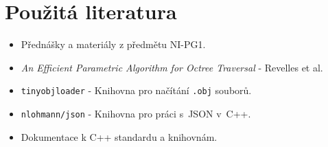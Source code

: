 \documentclass[10pt,a4paper,twocolumn]{article}
\begin{document}
\section{Použitá literatura}
\begin{itemize}
    \item Přednášky a materiály z předmětu NI-PG1.
    \item \textit{An Efficient Parametric Algorithm for Octree Traversal} - Revelles et al.
    \item \texttt{tinyobjloader} - Knihovna pro načítání \texttt{.obj} souborů.
    \item \texttt{nlohmann/json} - Knihovna pro práci s~JSON v~C++.
    \item Dokumentace k C++ standardu a knihovnám.
\end{itemize}
\end{document}
